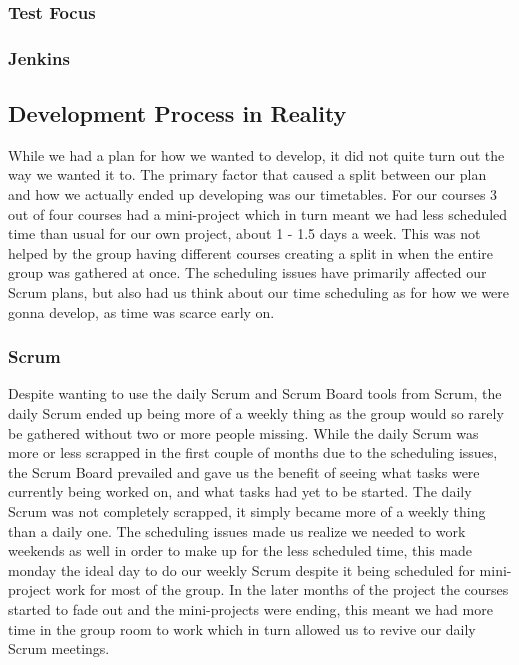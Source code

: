 \subsubsection{Test Focus}
\subsubsection{Jenkins}
\subsection{Development Process in Reality}
While we had a plan for how we wanted to develop, it did not quite turn out the way we wanted it to.
The primary factor that caused a split between our plan and how we actually ended up developing was our timetables.
For our courses 3 out of four courses had a mini-project which in turn meant we had less scheduled time than usual for our own project, about 1 - 1.5 days a week.
This was not helped by the group having different courses creating a split in when the entire group was gathered at once.
The scheduling issues have primarily affected our Scrum plans, but also had us think about our time scheduling as for how we were gonna develop, as time was scarce early on.
\subsubsection{Scrum}
Despite wanting to use the daily Scrum and Scrum Board tools from Scrum, the daily Scrum ended up being more of a weekly thing as the group would so rarely be gathered without two or more people missing.
While the daily Scrum was more or less scrapped in the first couple of months due to the scheduling issues, the Scrum Board prevailed and gave us the benefit of seeing what tasks were currently being worked on, and what tasks had yet to be started.
The daily Scrum was not completely scrapped, it simply became more of a weekly thing than a daily one.
The scheduling issues made us realize we needed to work weekends as well in order to make up for the less scheduled time, this made monday the ideal day to do our weekly Scrum despite it being scheduled for mini-project work for most of the group.
In the later months of the project the courses started to fade out and the mini-projects were ending, this meant we had more time in the group room to work which in turn allowed us to revive our daily Scrum meetings.
